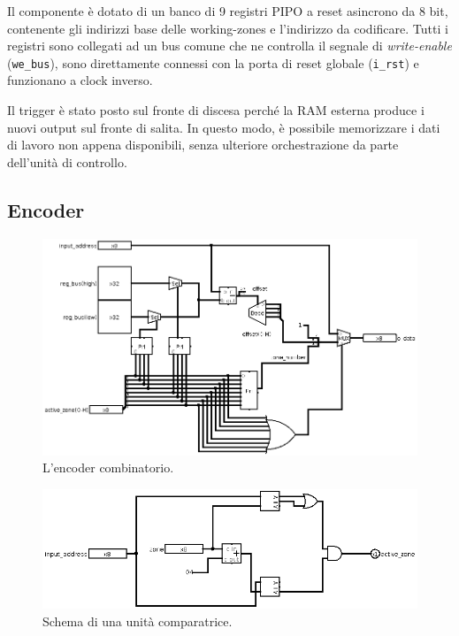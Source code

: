 \documentclass[11pt,a4paper]{article}
\begin{document}
Il componente è dotato di un banco di 9 registri PIPO a reset asincrono da 8 bit, contenente gli indirizzi base delle working-zones e l'indirizzo da
codificare. Tutti i registri sono collegati ad un bus comune che ne controlla il segnale di \emph{write-enable} (\lstinline{we_bus}), sono direttamente
connessi con la porta di reset globale (\lstinline{i_rst}) e funzionano a clock inverso.

Il trigger è stato posto sul fronte di discesa perché la RAM esterna produce i nuovi output sul fronte di salita. In questo modo, è possibile memorizzare i
dati di lavoro non appena disponibili, senza ulteriore orchestrazione da parte dell'unità di controllo.

\subsection{Encoder}
\begin{figure}[htp]
    \includegraphics[scale=0.4]{encoder.png}
    \caption[Encoder]{L'encoder combinatorio.}
\end{figure}

\begin{figure}[hp]
    \includegraphics[scale=0.4]{comparator.png}
    \caption[Comparatore]{Schema di una unità comparatrice.\label{comparator}}
\end{figure}
\end{document}
